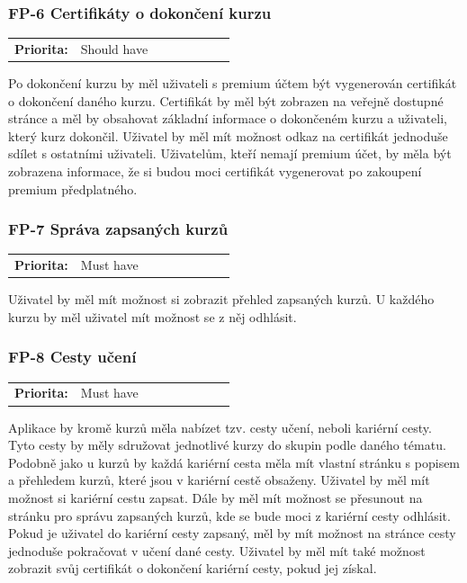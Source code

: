 \subsubsection{FP-6 Certifikáty o dokončení kurzu}\label{sec:fp-course-certificate}

\begin{tabular}{lp{0.7\linewidth}}
    \textbf{Priorita:} & Should have \\
\end{tabular}

Po dokončení kurzu by měl uživateli s premium účtem být vygenerován certifikát o dokončení daného kurzu. Certifikát by měl být zobrazen na veřejně dostupné stránce a měl by obsahovat základní informace o dokončeném kurzu a uživateli, který kurz dokončil. Uživatel by měl mít možnost odkaz na certifikát jednoduše sdílet s ostatními uživateli. Uživatelům, kteří nemají premium účet, by měla být zobrazena informace, že si budou moci certifikát vygenerovat po zakoupení premium předplatného.

\subsubsection{FP-7 Správa zapsaných kurzů}\label{sec:fp-course-management}

\begin{tabular}{lp{0.7\linewidth}}
    \textbf{Priorita:} & Must have \\
\end{tabular}

Uživatel by měl mít možnost si zobrazit přehled zapsaných kurzů. U každého kurzu by měl uživatel mít možnost se z něj odhlásit.

\subsubsection{FP-8 Cesty učení}\label{sec:fp-learning-paths}

\begin{tabular}{lp{0.7\linewidth}}
    \textbf{Priorita:} & Must have \\
\end{tabular}

Aplikace by kromě kurzů měla nabízet tzv. cesty učení, neboli kariérní cesty. Tyto cesty by měly sdružovat jednotlivé kurzy do skupin podle daného tématu. Podobně jako u kurzů by každá kariérní cesta měla mít vlastní stránku s popisem a přehledem kurzů, které jsou v kariérní cestě obsaženy. Uživatel by měl mít možnost si kariérní cestu zapsat. Dále by měl mít možnost se přesunout na stránku pro správu zapsaných kurzů, kde se bude moci z kariérní cesty odhlásit. Pokud je uživatel do kariérní cesty zapsaný, měl by mít možnost na stránce cesty jednoduše pokračovat v učení dané cesty. Uživatel by měl mít také možnost zobrazit svůj certifikát o dokončení kariérní cesty, pokud jej získal.

